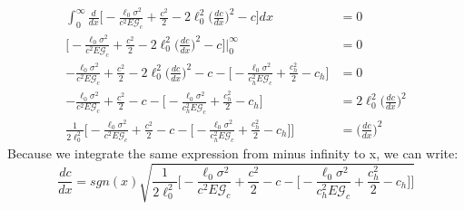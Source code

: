 \documentclass[12pt,3p]{article}
\numberwithin{equation}{section}
\begin{document}
\begin{align*}
\int_{0}^{\infty} \frac{d}{dx} \bigg[ - \frac{\ell_0 \sigma^2}{c^2 E \mathcal{G}_c} + \frac{c^2}{2} - 2 \ell_0^2 \bigg( \frac{dc }{d x} \bigg)^2 -  c  \bigg] dx &= 0 \\
\bigg[ - \frac{\ell_0 \sigma^2}{c^2 E \mathcal{G}_c} + \frac{c^2}{2} - 2 \ell_0^2 \bigg( \frac{dc }{d x} \bigg)^2 -  c  \bigg] \bigg\rvert_{0}^{\infty} &= 0 \\
- \frac{\ell_0 \sigma^2}{c^2 E \mathcal{G}_c} + \frac{c^2}{2} - 2 \ell_0^2 \bigg( \frac{dc }{d x} \bigg)^2 -  c  - \bigg[ - \frac{\ell_0 \sigma^2}{c_h^2 E \mathcal{G}_c} + \frac{c_h^2}{2} -  c_h \bigg] &= 0  \\
- \frac{\ell_0 \sigma^2}{c^2 E \mathcal{G}_c} + \frac{c^2}{2}  -  c  - \bigg[ - \frac{\ell_0 \sigma^2}{c_h^2 E \mathcal{G}_c} + \frac{c_h^2}{2} -  c_h \bigg] &= 2 \ell_0^2 \bigg( \frac{dc }{d x} \bigg)^2 \\
\frac{1}{2 \ell_0^2} \bigg[ - \frac{\ell_0 \sigma^2}{c^2 E \mathcal{G}_c} + \frac{c^2}{2}  -  c  - \bigg[ - \frac{\ell_0 \sigma^2}{c_h^2 E \mathcal{G}_c} + \frac{c_h^2}{2} -  c_h \bigg] \bigg] &= \bigg( \frac{dc }{d x} \bigg)^2 
\end{align*}
Because we integrate the same expression from minus infinity to x, we can write:
\begin{equation}
\frac{dc}{dx} = sgn(x) \sqrt{\frac{1}{2 \ell_0^2} \bigg[ - \frac{\ell_0 \sigma^2}{c^2 E \mathcal{G}_c} + \frac{c^2}{2}  -  c  - \bigg[ - \frac{\ell_0 \sigma^2}{c_h^2 E \mathcal{G}_c} + \frac{c_h^2}{2} -  c_h \bigg] \bigg]}
\end{equation}


\end{document}
